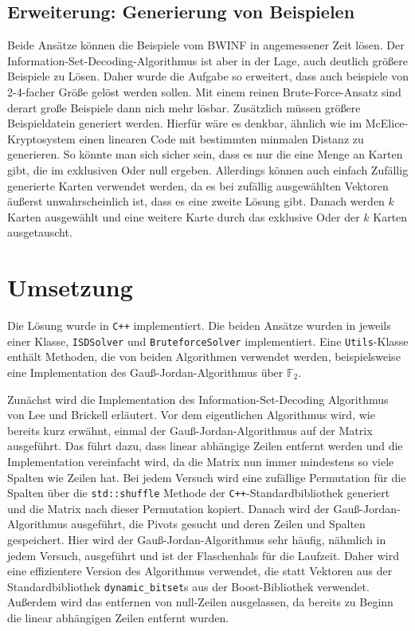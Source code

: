 \documentclass[a4paper,10pt,ngerman]{scrartcl}
\begin{document}
\subsection{Erweiterung: Generierung von Beispielen}
Beide Ansätze können die Beispiele vom BWINF in angemessener Zeit lösen.
Der Information-Set-Decoding-Algorithmus ist aber in der Lage, auch deutlich größere Beispiele zu Lösen. Daher wurde die Aufgabe so erweitert, dass auch beispiele von 2-4-facher Größe gelöst werden sollen. Mit einem reinen Brute-Force-Ansatz sind derart große Beispiele dann nich mehr lösbar. Zusätzlich müssen größere Beispieldatein generiert werden.
Hierfür wäre es denkbar, ähnlich wie im McElice-Kryptosystem einen linearen Code mit bestimmten minmalen Distanz zu generieren. So könnte man sich sicher sein, dass es nur die eine Menge an Karten gibt, die im exklusiven Oder null ergeben. Allerdings können auch einfach Zufällig generierte Karten verwendet werden, da es bei zufällig ausgewählten Vektoren äußerst unwahrscheinlich ist, dass es eine zweite Lösung gibt. Danach werden $k$ Karten ausgewählt und eine weitere Karte durch das exklusive Oder der $k$ Karten ausgetauscht.

\section{Umsetzung}
Die Lösung wurde in \texttt{C++} implementiert. Die beiden Ansätze wurden in jeweils einer Klasse, \lstinline{ISDSolver} und \lstinline{BruteforceSolver} implementiert. Eine \lstinline{Utils}-Klasse enthält Methoden, die von beiden Algorithmen verwendet werden, beispielsweise eine Implementation des Gauß-Jordan-Algorithmus über $\mathbb{F}_2$.

Zunächst wird die Implementation des Information-Set-Decoding Algorithmus von Lee und Brickell erläutert.
Vor dem eigentlichen Algorithmus wird, wie bereits kurz erwähnt, einmal der Gauß-Jordan-Algorithmus auf der Matrix ausgeführt. 
Das führt dazu, dass linear abhängige Zeilen entfernt werden und die Implementation vereinfacht wird, da die Matrix nun immer mindestens so viele Spalten wie Zeilen hat.
Bei jedem Versuch wird eine zufällige Permutation für die Spalten über die \lstinline{std::shuffle} Methode der \texttt{C++}-Standardbibliothek generiert und die Matrix nach dieser Permutation kopiert. 
Danach wird der Gauß-Jordan-Algorithmus ausgeführt, die Pivots gesucht und deren Zeilen und Spalten gespeichert. 
Hier wird der Gauß-Jordan-Algorithmus sehr häufig, nähmlich in jedem Versuch, ausgeführt und ist der Flaschenhals für die Laufzeit. 
Daher wird eine effizientere Version des Algorithmus verwendet, die statt Vektoren aus der Standardbibliothek \lstinline{dynamic_bitset}s aus der Boost-Bibliothek verwendet.
Außerdem wird das entfernen von null-Zeilen ausgelassen, da bereits zu Beginn die linear abhängigen Zeilen entfernt wurden.
\end{document}
